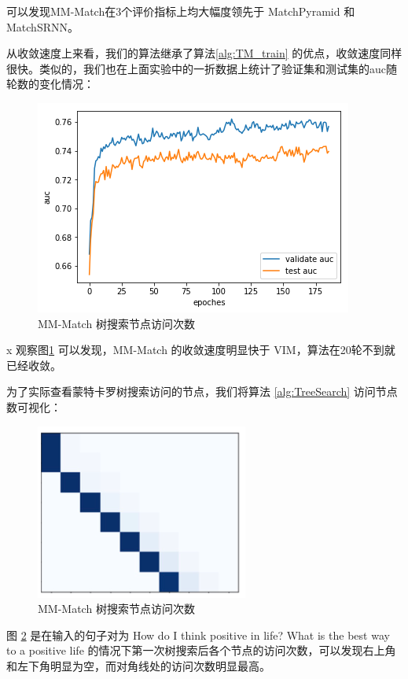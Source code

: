 可以发现MM-Match在3个评价指标上均大幅度领先于 MatchPyramid 和 MatchSRNN。

从收敛速度上来看，我们的算法继承了算法\ref{alg:TM_train} 的优点，收敛速度同样很快。类似的，我们也在上面实验中的一折数据上统计了验证集和测试集的auc随轮数的变化情况：

\begin{figure}[!htbp]
\vspace{1em}
\centering
  \includegraphics[width=0.8\linewidth]{figures/MCTS_line}
  \caption{MM-Match 树搜索节点访问次数}
  \label{fig:MCTS_line}       %
\vspace{1em}
\end{figure}
x
观察图\ref{fig:MCTS_line} 可以发现，MM-Match 的收敛速度明显快于 VIM，算法在20轮不到就已经收敛。

为了实际查看蒙特卡罗树搜索访问的节点，我们将算法 \ref{alg:TreeSearch} 访问节点数可视化：

\begin{figure}[!htbp]
\vspace{1em}
\centering
  \includegraphics[width=0.4\linewidth]{figures/MCTS_exp_path}
  \caption{MM-Match 树搜索节点访问次数}
  \label{fig:MCTS_exp_path}       %
\vspace{1em}
\end{figure}

图 \ref{fig:MCTS_exp_path} 是在输入的句子对为 How do I think positive in life? What is the best way to a positive life 的情况下第一次树搜索后各个节点的访问次数，可以发现右上角和左下角明显为空，而对角线处的访问次数明显最高。

